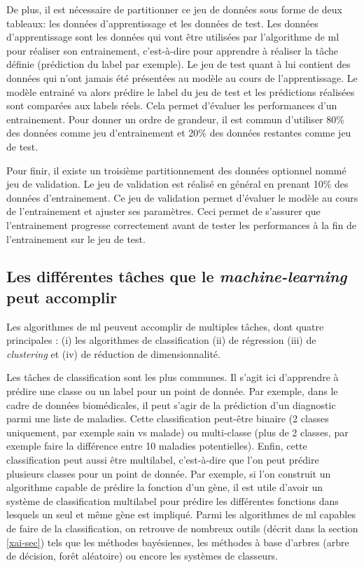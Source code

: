 De plus, il est nécessaire de partitionner ce jeu de données sous forme de deux tableaux: les données d'apprentissage et les données de test. Les données d'apprentissage sont les données qui vont être utilisées par l'algorithme de \gls{ml} pour réaliser son entrainement, c'est-à-dire pour apprendre à réaliser la tâche définie (prédiction du label par exemple). Le jeu de test quant à lui contient des données qui n'ont jamais été présentées au modèle au cours de l'apprentissage. Le modèle entrainé va alors prédire le label du jeu de test et les prédictions réalisées sont comparées aux labels réels. Cela permet d'évaluer les performances d'un entrainement. Pour donner un ordre de grandeur, il est commun d'utiliser 80\% des données comme jeu d'entrainement et 20\% des données restantes comme jeu de test.

Pour finir, il existe un troisième partitionnement des données optionnel nommé jeu de validation. Le jeu de validation est réalisé en général en prenant 10\% des données d'entrainement. Ce jeu de validation permet d'évaluer le modèle au cours de l'entrainement et  ajuster ses paramètres. Ceci permet de s'assurer que l'entrainement progresse correctement avant de tester les performances à la fin de l'entrainement sur le jeu de test.

\subsection{Les différentes tâches que le \textit{machine-learning} peut accomplir}
Les algorithmes de \gls{ml} peuvent accomplir de multiples tâches, dont quatre principales : (i) les algorithmes de classification (ii) de régression (iii) de \textit{clustering} et (iv) de réduction de dimensionnalité.

Les tâches de classification sont les plus communes. Il s'agit ici d'apprendre à prédire une classe ou un label pour un point de donnée. Par exemple, dans le cadre de données biomédicales, il peut s'agir de la prédiction d'un diagnostic parmi une liste de maladies. Cette classification peut-être binaire (2 classes uniquement, par exemple sain vs malade) ou multi-classe (plus de 2 classes, par exemple faire la différence entre 10 maladies potentielles). Enfin, cette classification peut aussi être multilabel, c'est-à-dire que l'on peut prédire plusieurs classes pour un point de donnée. Par exemple, si l’on construit un algorithme capable de prédire la fonction d'un gène, il est utile d'avoir un système de classification multilabel pour prédire les différentes fonctions dans lesquels un seul et même gène est impliqué. Parmi les algorithmes de \gls{ml} capables de faire de la classification, on retrouve de nombreux outils (décrit dans la section \ref{xai-sec}) tels que les méthodes bayésiennes, les méthodes à base d'arbres (arbre de décision, forêt aléatoire) ou encore les systèmes de classeurs.

